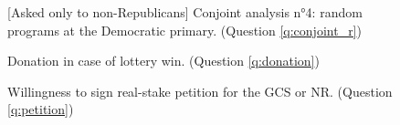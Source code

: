 \begin{figure}[h!] %
    \caption{[Asked only to non-Republicans] Conjoint analysis n°4: random programs at the Democratic primary. (Question \ref{q:conjoint_r})}\label{fig:ca_r}
\end{figure}

\begin{figure}[h!]
    \caption{Donation in case of lottery win. (Question \ref{q:donation})}\label{fig:donation}
\end{figure}

\begin{figure}[h!]
    \caption{Willingness to sign real-stake petition for the GCS or NR. (Question \ref{q:petition})}\label{fig:petition}
\end{figure}

